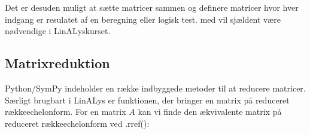\documentclass[letterpaper,10pt,english]{jupyterBook}
\begin{document}
\noindent{}

\begin{sphinxVerbatim}[commandchars=\\\{\}]
   
\end{sphinxVerbatim}

\noindent{}

Det er desuden muligt at sætte matricer sammen og definere matricer hvor hver indgang er resulatet af en beregning eller logisk test.  med vil sjældent være nødvendige i LinALys\sphinxhyphen{}kurset.


\subsection{Matrix\sphinxhyphen{}reduktion}
\label{\detokenize{notebooks/sympy/Notebook_LinAlg1:matrix-reduktion}}
Python/SymPy indeholder en række indbyggede metoder til at reducere matricer. Særligt brugbart i LinALys er funktionen, der bringer en matrix på reduceret række\sphinxhyphen{}echelonform. For en matrix \(A\) kan vi finde den ækvivalente matrix på reduceret række\sphinxhyphen{}echelonform ved .rref():

\begin{sphinxVerbatim}[commandchars=\\\{\}]
  \PYG{p}{[}\PYG{p}{[}   \PYG{p}{]} \PYG{p}{[}   \PYG{p}{]} \PYG{p}{[}   \PYG{p}{]}\PYG{p}{]}
\end{sphinxVerbatim}

\noindent{}

\noindent{}
\end{document}
